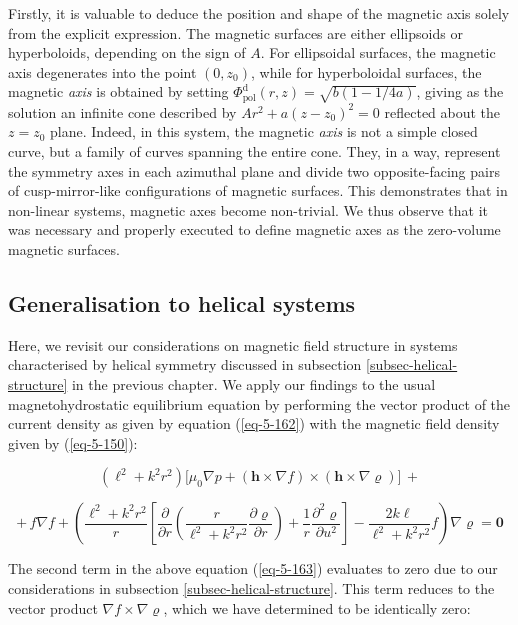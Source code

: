 Firstly, it is valuable to deduce the position and shape of the magnetic axis solely from the explicit expression. The magnetic surfaces are either ellipsoids or hyperboloids, depending on the sign of $A$. For ellipsoidal surfaces, the magnetic axis degenerates into the point $(0,z_0)$, while for hyperboloidal surfaces, the magnetic \textit{axis} is obtained by setting $\Phi_\text{pol}^\mathrm{d}(r,z)=\sqrt{b(1-1/4a)}$, giving as the solution an infinite cone described by $Ar^2+a(z-z_0)^2=0$ reflected about the $z=z_0$ plane. Indeed, in this system, the magnetic \textit{axis} is not a simple closed curve, but a family of curves spanning the entire cone. They, in a way, represent the symmetry axes in each azimuthal plane and divide two opposite-facing pairs of cusp-mirror-like configurations of magnetic surfaces. This demonstrates that in non-linear systems, magnetic axes become non-trivial. We thus observe that it was necessary and properly executed to define magnetic axes as the zero-volume magnetic surfaces.

\subsection{Generalisation to helical systems}

Here, we revisit our considerations on magnetic field structure in systems characterised by helical symmetry discussed in subsection \ref{subsec-helical-structure} in the previous chapter. We apply our findings to the usual magnetohydrostatic equilibrium equation by performing the vector product of the current density as given by equation (\ref{eq-5-162}) with the magnetic field density given by (\ref{eq-5-150}):

\begin{equation*}
    (\ell^2+k^2r^2)\Big[\mu_0\nabla p+(\mathbf{h}\times\nabla f)\times(\mathbf{h}\times\nabla\varrho)\Big]\,+
\end{equation*}

\begin{equation}
    \label{eq-5-163}
    +\,f\nabla f+\left(\frac{\ell^2+k^2r^2}{r}\left[\frac{\partial}{\partial r}\left(\frac{r}{\ell^2+k^2r^2}\frac{\partial\varrho}{\partial r}\right)+\frac{1}{r}\frac{\partial^2\varrho}{\partial u^2}\right]-\frac{2k\ell}{\ell^2+k^2r^2}f\right)\nabla\varrho=\mathbf{0}
\end{equation}

The second term in the above equation (\ref{eq-5-163}) evaluates to zero due to our considerations in subsection \ref{subsec-helical-structure}. This term reduces to the vector product $\nabla f\times\nabla\varrho$, which we have determined to be identically zero:

